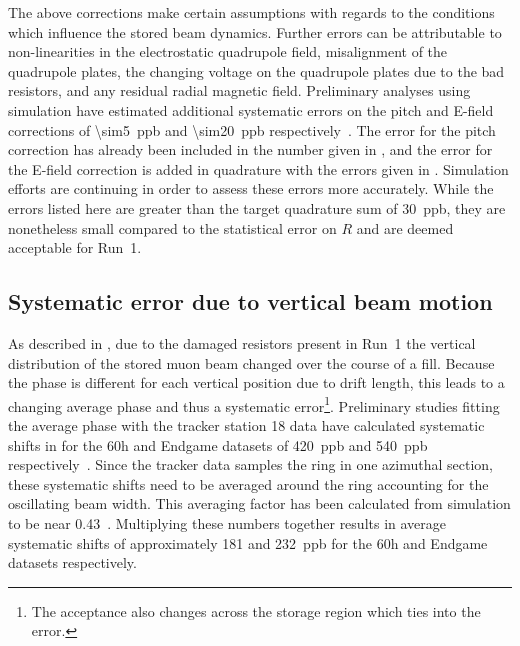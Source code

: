 The above corrections make certain assumptions with regards to the conditions which influence the stored beam dynamics. Further errors can be attributable to non-linearities in the electrostatic quadrupole field, misalignment of the quadrupole plates, the changing voltage on the quadrupole plates due to the bad resistors, and any residual radial magnetic field. Preliminary analyses using simulation have estimated additional systematic errors on the pitch and E-field corrections of \SI{\sim5}{ppb} and \SI{\sim20}{ppb} respectively~\cite{DaveRubinElbaBadResistors,DaveRubinBadResistorsUpdate}. The error for the pitch correction has already been included in the number given in , and the error for the E-field correction is added in quadrature with the errors given in . Simulation efforts are continuing in order to assess these errors more accurately. While the errors listed here are greater than the target quadrature sum of \SI{30}{ppb}, they are nonetheless small compared to the statistical error on $R$ and are deemed acceptable for Run~1.


\subsection{Systematic error due to vertical beam motion}


As described in , due to the damaged resistors present in Run~1 the vertical distribution of the stored muon beam changed over the course of a fill. Because the \gmtwo phase is different for each vertical position due to drift length, this leads to a changing average phase and thus a systematic error\footnote{The acceptance also changes across the storage region which ties into the error.}. Preliminary studies fitting the average \gmtwo phase with the tracker station 18 data have calculated systematic shifts in \wa for the 60h and Endgame datasets of \SI{420}{ppb} and \SI{540}{ppb} respectively~\cite{BadResistorsVolodyaNewer}. Since the tracker data samples the ring in one azimuthal section, these systematic shifts need to be averaged around the ring accounting for the oscillating beam width. This averaging factor has been calculated from simulation to be near 0.43~\cite{MorseDavidBetaFunctions}. Multiplying these numbers together results in average systematic shifts of approximately \SI{181}{} and \SI{232}{ppb} for the 60h and Endgame datasets respectively.


